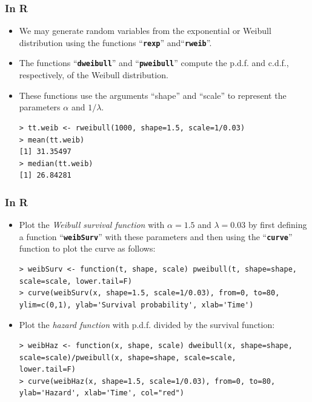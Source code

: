 \documentclass{beamer}
\newcommand{\empr}[1]{{\emph{\color{red}#1}}}
\newcommand{\pkg}[1]{{\textbf{\texttt{#1}}}}
\begin{document}
\pagebreak
\begin{frame}[fragile]
\frametitle{In R}
\begin{itemize}	
	\item We may generate random variables from the exponential or Weibull distribution using the functions ``\pkg{rexp}'' and``\pkg{rweib}''.
	\item The functions ``\pkg{dweibull}'' and ``\pkg{pweibull}'' compute the p.d.f. and c.d.f., respectively, of the Weibull distribution.
	\item These functions use the arguments ``{\color{red}shape}'' and ``{\color{red}scale}'' to represent the parameters $\alpha$ and $1/\lambda$.
	
\begin{Verbatim}
> tt.weib <- rweibull(1000, shape=1.5, scale=1/0.03)
> mean(tt.weib)
[1] 31.35497
> median(tt.weib)
[1] 26.84281
\end{Verbatim}

\end{itemize}
\end{frame}

\pagebreak
\begin{frame}[fragile]
\frametitle{In R}
\begin{itemize}	
\item Plot the \empr{Weibull survival function} with  
$\alpha=1.5$ and \linebreak $\lambda=0.03$ by first defining a function ``\pkg{weibSurv}'' with these parameters and then using the ``\pkg{curve}'' function to plot the curve as follows:
\begin{Verbatim}
> weibSurv <- function(t, shape, scale) pweibull(t, shape=shape, 
scale=scale, lower.tail=F)
> curve(weibSurv(x, shape=1.5, scale=1/0.03), from=0, to=80, 
ylim=c(0,1), ylab='Survival probability', xlab='Time')
\end{Verbatim}
\item Plot the \empr{hazard function} with  
p.d.f. divided by the survival function:
\begin{Verbatim}
> weibHaz <- function(x, shape, scale) dweibull(x, shape=shape, 
scale=scale)/pweibull(x, shape=shape, scale=scale,
lower.tail=F)
> curve(weibHaz(x, shape=1.5, scale=1/0.03), from=0, to=80,
ylab='Hazard', xlab='Time', col="red")
\end{Verbatim}
\end{itemize}
\end{frame}
\end{document}

